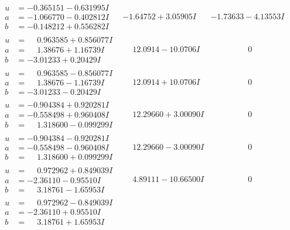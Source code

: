 \documentclass[1p]{elsarticle_modified}
\theoremstyle{definition}
\begin{document}
$$\begin{array}{c|c|c}
\begin{aligned}
u &= -0.365151 - 0.631995 I \\
a &= -1.066770 - 0.402812 I \\
b &= -0.148212 + 0.556282 I\end{aligned}
 & -1.64752 + 3.05905 I & -1.73633 - 4.13553 I \\ \hline\begin{aligned}
u &= \phantom{-}0.963585 + 0.856077 I \\
a &= \phantom{-}1.38676 + 1.16739 I \\
b &= -3.01233 + 0.20429 I\end{aligned}
 & \phantom{-}12.0914 - 10.0706 I & \phantom{-0.000000 } 0 \\ \hline\begin{aligned}
u &= \phantom{-}0.963585 - 0.856077 I \\
a &= \phantom{-}1.38676 - 1.16739 I \\
b &= -3.01233 - 0.20429 I\end{aligned}
 & \phantom{-}12.0914 + 10.0706 I & \phantom{-0.000000 } 0 \\ \hline\begin{aligned}
u &= -0.904384 + 0.920281 I \\
a &= -0.558498 + 0.960408 I \\
b &= \phantom{-}1.318600 - 0.099299 I\end{aligned}
 & \phantom{-}12.29660 + 3.00090 I & \phantom{-0.000000 } 0 \\ \hline\begin{aligned}
u &= -0.904384 - 0.920281 I \\
a &= -0.558498 - 0.960408 I \\
b &= \phantom{-}1.318600 + 0.099299 I\end{aligned}
 & \phantom{-}12.29660 - 3.00090 I & \phantom{-0.000000 } 0 \\ \hline\begin{aligned}
u &= \phantom{-}0.972962 + 0.849039 I \\
a &= -2.36110 - 0.95510 I \\
b &= \phantom{-}3.18761 - 1.65953 I\end{aligned}
 & \phantom{-}4.89111 - 10.66500 I & \phantom{-0.000000 } 0 \\ \hline\begin{aligned}
u &= \phantom{-}0.972962 - 0.849039 I \\
a &= -2.36110 + 0.95510 I \\
b &= \phantom{-}3.18761 + 1.65953 I\end{aligned}

\end{array}$$
\end{document}
